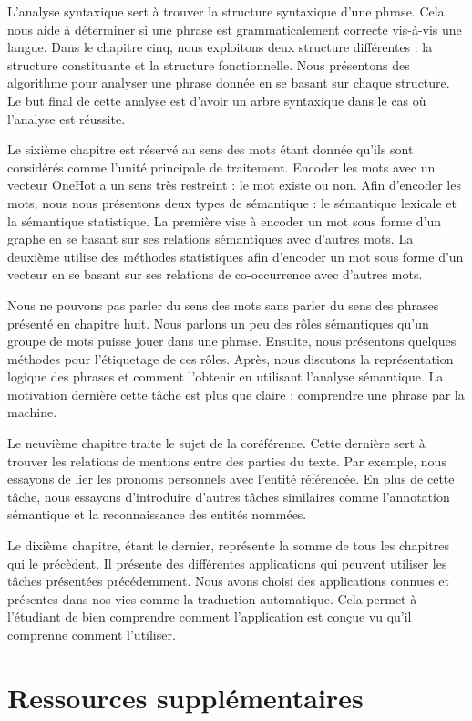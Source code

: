 \documentclass{KodeBook}
\begin{document}
L'analyse syntaxique sert à trouver la structure syntaxique d'une phrase.
Cela nous aide à déterminer si une phrase est grammaticalement correcte vis-à-vis une langue.
Dans le chapitre cinq, nous exploitons deux structure différentes : la structure constituante et la structure fonctionnelle.
Nous présentons des algorithme pour analyser une phrase donnée en se basant sur chaque structure.
Le but final de cette analyse est d'avoir un arbre syntaxique dans le cas où l'analyse est réussite.


Le sixième chapitre est réservé au sens des mots étant donnée qu'ils sont considérés comme l'unité principale de traitement.
Encoder les mots avec un vecteur OneHot a un sens très restreint : le mot existe ou non.
Afin d'encoder les mots, nous nous présentons deux types de sémantique : le sémantique lexicale et la sémantique statistique.
La première vise à encoder un mot sous forme d'un graphe en se basant sur ses relations sémantiques avec d'autres mots.
La deuxième utilise des méthodes statistiques afin d'encoder un mot sous forme d'un vecteur en se basant sur ses relations de co-occurrence avec d'autres mots.


Nous ne pouvons pas parler du sens des mots sans parler du sens des phrases présenté en chapitre huit.
Nous parlons un peu des rôles sémantiques qu'un groupe de mots puisse jouer dans une phrase.
Ensuite, nous présentons quelques méthodes pour l'étiquetage de ces rôles.
Après, nous discutons la représentation logique des phrases et comment l'obtenir en utilisant l'analyse sémantique.
La motivation dernière cette tâche est plus que claire : comprendre une phrase par la machine.


Le neuvième chapitre traite le sujet de la coréférence.
Cette dernière sert à trouver les relations de mentions entre des parties du texte.
Par exemple, nous essayons de lier les pronoms personnels avec l'entité référencée.
En plus de cette tâche, nous essayons d'introduire d'autres tâches similaires comme l'annotation sémantique et la reconnaissance des entités nommées.


Le dixième chapitre, étant le dernier, représente la somme de tous les chapitres qui le précèdent.
Il présente des différentes applications qui peuvent utiliser les tâches présentées précédemment.
Nous avons choisi des applications connues et présentes dans nos vies comme la traduction automatique.
Cela permet à l'étudiant de bien comprendre comment l'application est conçue vu qu'il comprenne comment l'utiliser.


\section*{Ressources supplémentaires}
\end{document}
